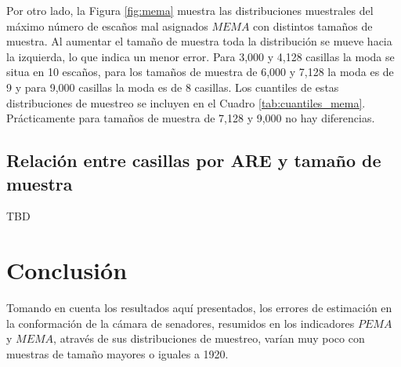 \documentclass[]{article}
\let\rmarkdownfootnote\footnote%
\def\footnote{\protect\rmarkdownfootnote}
\begin{document}
Por otro lado, la Figura \ref{fig:mema} muestra las distribuciones muestrales del máximo número de escaños mal asignados $MEMA$ con distintos tamaños de muestra. Al aumentar el tamaño de muestra toda la distribución se mueve hacia la izquierda, lo que indica un menor error. Para 3,000 y 4,128 casillas la moda se situa en 10 escaños, para los tamaños de muestra de 6,000 y 7,128 la moda es de 9 y para 9,000 casillas la moda es de 8 casillas. Los cuantiles de estas distribuciones de muestreo se incluyen en el Cuadro \ref{tab:cuantiles_mema}. Prácticamente para tamaños de muestra de 7,128 y 9,000 no hay diferencias. 


\hypertarget{caes-casillas}{%
\subsection{Relación entre casillas por ARE y tamaño de muestra}}

TBD

%


\hypertarget{conclusión}{%
\section{Conclusión}
\label{conclusión}}

Tomando en cuenta los resultados aquí presentados, los errores de estimación en la conformación de la cámara de senadores, resumidos en los indicadores $PEMA$ y $MEMA$, através de sus distribuciones de muestreo, varían muy poco con muestras de tamaño mayores o iguales a 1920.
\end{document}
